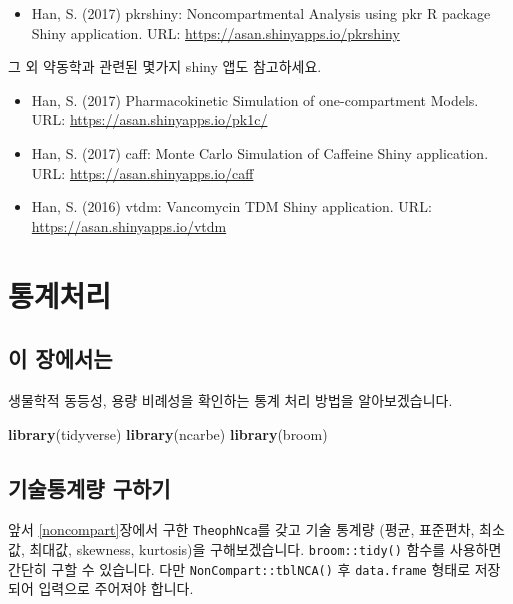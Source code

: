 \documentclass[12pt,]{krantz}
\newenvironment{Shaded}{\begin{snugshade}}{\end{snugshade}}
\newcommand{\KeywordTok}[1]{\textcolor[rgb]{0.13,0.29,0.53}{\textbf{#1}}}
\newcommand{\NormalTok}[1]{#1}
\providecommand{\tightlist}{%
  \setlength{\itemsep}{0pt}\setlength{\parskip}{0pt}}
\theoremstyle{definition}
\theoremstyle{definition}
\theoremstyle{definition}
\theoremstyle{remark}
\begin{document}
\begin{itemize}
\tightlist
\item
  Han, S. (2017) pkrshiny: Noncompartmental Analysis using pkr R package
  Shiny application. URL: \url{https://asan.shinyapps.io/pkrshiny}
\end{itemize}

그 외 약동학과 관련된 몇가지 shiny 앱도 참고하세요.

\begin{itemize}
\tightlist
\item
  Han, S. (2017) Pharmacokinetic Simulation of one-compartment Models.
  URL: \url{https://asan.shinyapps.io/pk1c/}
\item
  Han, S. (2017) caff: Monte Carlo Simulation of Caffeine Shiny
  application. URL: \url{https://asan.shinyapps.io/caff}
\item
  Han, S. (2016) vtdm: Vancomycin TDM Shiny application. URL:
  \url{https://asan.shinyapps.io/vtdm}
\end{itemize}

\chapter{통계처리}\label{statistics}

\section{이 장에서는}\label{stat-intro}

생물학적 동등성, 용량 비례성을 확인하는 통계 처리 방법을 알아보겠습니다.

\begin{Shaded}
\begin{Highlighting}[]
\KeywordTok{library}\NormalTok{(tidyverse)}
\KeywordTok{library}\NormalTok{(ncarbe)}
\KeywordTok{library}\NormalTok{(broom)}
\end{Highlighting}
\end{Shaded}

\section{기술통계량 구하기}\label{-}

앞서 \ref{noncompart}장에서 구한 \texttt{TheophNca}를 갖고 기술 통계량
(평균, 표준편차, 최소값, 최대값, skewness, kurtosis)을 구해보겠습니다.
\texttt{broom::tidy()} 함수를 사용하면 간단히 구할 수 있습니다. 다만
\texttt{NonCompart::tblNCA()} 후 \texttt{data.frame} 형태로 저장되어
입력으로 주어져야 합니다.
\end{document}
